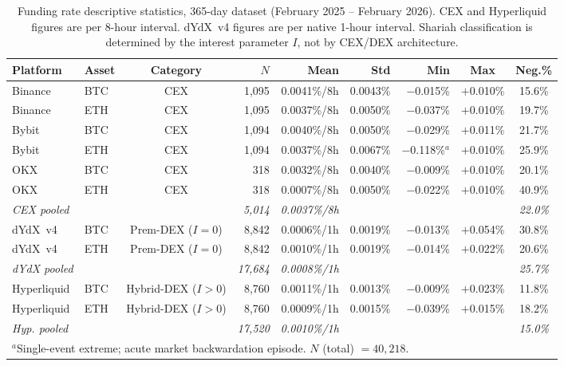 \documentclass[10pt,twocolumn]{article}
\begin{document}
\begin{table}[htbp]
\centering
\caption{Funding rate descriptive statistics, 365-day dataset (February 2025 --
February 2026). CEX and Hyperliquid figures are per 8-hour interval. dYdX~v4
figures are per native 1-hour interval. Shariah classification is determined by
the interest parameter $I$, not by CEX/DEX architecture.}
\label{tab:stats}
\small
\setlength{\tabcolsep}{5pt}
\begin{tabular}{@{}llcrrrrcc@{}}
\toprule
\textbf{Platform} & \textbf{Asset} & \textbf{Category} & \textbf{$N$} &
\textbf{Mean} & \textbf{Std} & \textbf{Min} & \textbf{Max} & \textbf{Neg.\%} \\
\midrule
Binance & BTC & CEX & 1{,}095 & 0.0041\%/8h & 0.0043\% & $-$0.015\% & $+$0.010\% & 15.6\% \\
Binance & ETH & CEX & 1{,}095 & 0.0037\%/8h & 0.0050\% & $-$0.037\% & $+$0.010\% & 19.7\% \\
Bybit   & BTC & CEX & 1{,}094 & 0.0040\%/8h & 0.0050\% & $-$0.029\% & $+$0.011\% & 21.7\% \\
Bybit   & ETH & CEX & 1{,}094 & 0.0037\%/8h & 0.0067\% & $-$0.118\%$^{a}$ & $+$0.010\% & 25.9\% \\
OKX     & BTC & CEX &   318   & 0.0032\%/8h & 0.0040\% & $-$0.009\% & $+$0.010\% & 20.1\% \\
OKX     & ETH & CEX &   318   & 0.0007\%/8h & 0.0050\% & $-$0.022\% & $+$0.010\% & 40.9\% \\
\addlinespace
\textit{CEX pooled} & & & \textit{5{,}014} & \textit{0.0037\%/8h} & & & & \textit{22.0\%} \\
\midrule
dYdX~v4 & BTC & Prem-DEX ($I=0$) & 8{,}842 & 0.0006\%/1h & 0.0019\% & $-$0.013\% & $+$0.054\% & 30.8\% \\
dYdX~v4 & ETH & Prem-DEX ($I=0$) & 8{,}842 & 0.0010\%/1h & 0.0019\% & $-$0.014\% & $+$0.022\% & 20.6\% \\
\addlinespace
\textit{dYdX pooled} & & & \textit{17{,}684} & \textit{0.0008\%/1h} & & & & \textit{25.7\%} \\
\midrule
Hyperliquid & BTC & Hybrid-DEX ($I>0$) & 8{,}760 & 0.0011\%/1h & 0.0013\% & $-$0.009\% & $+$0.023\% & 11.8\% \\
Hyperliquid & ETH & Hybrid-DEX ($I>0$) & 8{,}760 & 0.0009\%/1h & 0.0015\% & $-$0.039\% & $+$0.015\% & 18.2\% \\
\addlinespace
\textit{Hyp. pooled} & & & \textit{17{,}520} & \textit{0.0010\%/1h} & & & & \textit{15.0\%} \\
\bottomrule
\multicolumn{9}{l}{\footnotesize $^{a}$Single-event extreme; acute market backwardation episode. $N$ (total) $= 40{,}218$.}
\end{tabular}
\end{table}
\end{document}
